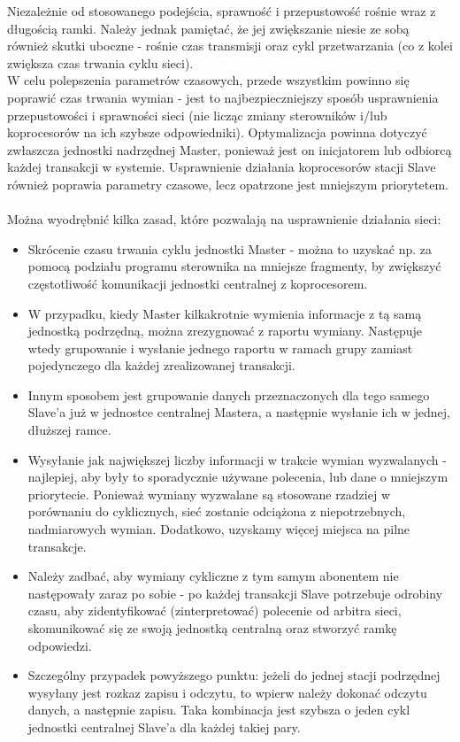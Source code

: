 \documentclass[a4paper,twoside]{article}
\begin{document}
	Niezależnie od stosowanego podejścia, sprawność i przepustowość rośnie wraz z długością ramki. Należy jednak pamiętać, że jej zwiększanie niesie ze sobą również skutki uboczne - rośnie czas transmisji oraz cykl przetwarzania (co z kolei zwiększa czas trwania cyklu sieci). \\
	W celu polepszenia parametrów czasowych, przede wszystkim powinno się poprawić czas trwania wymian - jest to najbezpieczniejszy sposób usprawnienia przepustowości i sprawności sieci (nie licząc zmiany sterowników i/lub koprocesorów na ich szybsze odpowiedniki). Optymalizacja powinna dotyczyć zwłaszcza jednostki nadrzędnej Master, ponieważ jest on inicjatorem lub odbiorcą każdej transakcji w systemie. Usprawnienie działania koprocesorów stacji Slave również poprawia parametry czasowe, lecz opatrzone jest mniejszym priorytetem. \\\\
	Można wyodrębnić kilka zasad, które pozwalają na usprawnienie działania sieci:
	\begin{itemize}
		\item Skrócenie czasu trwania cyklu jednostki Master - można to uzyskać np. za pomocą podziału programu sterownika na mniejsze fragmenty, by zwiększyć częstotliwość komunikacji jednostki centralnej z koprocesorem.
		\item W przypadku, kiedy Master kilkakrotnie wymienia informacje z tą samą jednostką podrzędną, można zrezygnować z raportu wymiany. Następuje wtedy grupowanie i wysłanie jednego raportu w ramach grupy zamiast pojedynczego dla każdej zrealizowanej transakcji.
		\item Innym sposobem jest grupowanie danych przeznaczonych dla tego samego Slave'a już w jednostce centralnej Mastera, a następnie wysłanie ich w jednej, dłuższej ramce.
		\item Wysyłanie jak największej liczby informacji w trakcie wymian wyzwalanych - najlepiej, aby były to sporadycznie używane polecenia, lub dane o mniejszym priorytecie. Ponieważ wymiany wyzwalane są stosowane rzadziej w porównaniu do cyklicznych, sieć zostanie odciążona z niepotrzebnych, nadmiarowych wymian. Dodatkowo, uzyskamy więcej miejsca na pilne transakcje.
		\item Należy zadbać, aby wymiany cykliczne z tym samym abonentem nie następowały zaraz po sobie - po każdej transakcji Slave potrzebuje odrobiny czasu, aby zidentyfikować (zinterpretować) polecenie od arbitra sieci, skomunikować się ze swoją jednostką centralną oraz stworzyć ramkę odpowiedzi.
		\item Szczególny przypadek powyższego punktu: jeżeli do jednej stacji podrzędnej wysyłany jest rozkaz zapisu i odczytu, to wpierw należy dokonać odczytu danych, a następnie zapisu. Taka kombinacja jest szybsza o jeden cykl jednostki centralnej Slave'a dla każdej takiej pary.
	\end{itemize}
\end{document}
